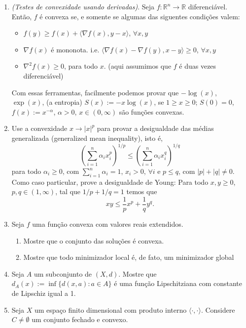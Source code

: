 \documentclass[a4paper,latin]{article}
\begin{document}
\begin{enumerate}
   \item {\it (Testes de convexidade usando derivadas)}.
   Seja $f: \mathbb{R}^{n} \rightarrow \mathbb{R}$ 
   diferenciável. 
   Então, $f$ é convexa se, e somente se 
   algumas das siguentes condições valem:
     \begin{itemize}
     \item $f(y)\geq f(x)+\langle \nabla f(x), y-x \rangle$, 
     $\forall x, y$
     \item $\nabla f (x)$ é mononota. i.e. 
     $\langle \nabla f(x)-\nabla f(y), x-y \rangle \geq 0$,  
      $\forall x, y$
     \item $\nabla^{2} f(x)\geq 0$, para todo $x$.
     (aqui assumimos que $f$ é duas vezes diferenciável)
     \end{itemize}
   Com essas ferramentas, facilmente podemos provar que $-\log(x)$, $\exp(x)$, (a entropia) $S(x):=-x\log(x)$, se $1\geq x\geq0$; $S(0)=0$, 
   $f(x):=x^{-\alpha}$, $\alpha>0$, $x \in (0,\infty)$ são funções convexas.   
    \item Use a convexidade $x\rightarrow |x|^{p}$  para provar a desigualdade das médias generalizada
    (generalized mean inequality), isto é, 
    $$ (\sum_{i=1}^{n} \alpha_{i}x_{i}^{p})^{1/p}
     \leq (\sum_{i=1}^{n} \alpha_{i}x_{i}^{q})^{1/q}$$ para todo $\alpha_{i}\geq 0$, com $\sum_{i=1}^{n}\alpha_{i}=1$, $x_{i}>0$, $\forall i$ e $p\leq q$, com 
     $|p|+|q|\neq0$.
    Como caso particular, prove a desigualdade de Young: Para todo $x,y \geq 0$, $p,q\in(1,\infty)$, tal que $1/p+1/q=1$ temos que 
    $$ xy \leq \frac{1}{p} x^{p}+\frac{1}{q}y^{q}. $$
    \item
    Seja $f$ uma  função convexa com valores reais extendidos. 
        \begin{enumerate}
        \item Mostre que o conjunto das soluções é convexa. 
        \item Mostre que todo minimizador local é, de fato, 
        um minimizador global 
        \end{enumerate} 
    \item Seja $A$ um subconjunto de $(X,d)$. Mostre que 
    $d_{A}(x):=\inf \{d(x,a): a \in A\}$ é 
    uma função Lipschitziana com constante de Lipschiz igual a 1. 
   \item 
   Seja $X$ um espaço finito dimensional com produto interno $\langle \cdot, \cdot \rangle$. 
   Considere $C\neq \emptyset$ um conjunto
   fechado e convexo. 
     \begin{enumerate}

\end{enumerate}
\end{enumerate}
\end{document}
